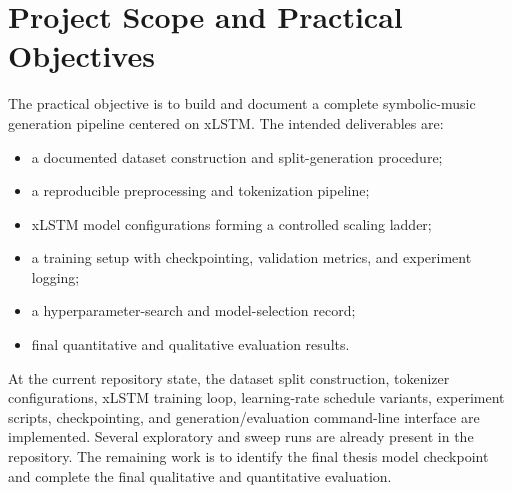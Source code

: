 \section{Project Scope and Practical Objectives}

The practical objective is to build and document a complete symbolic-music generation pipeline centered on xLSTM. The intended deliverables are:
\begin{itemize}
	\item a documented dataset construction and split-generation procedure;
	\item a reproducible preprocessing and tokenization pipeline;
	\item xLSTM model configurations forming a controlled scaling ladder;
	\item a training setup with checkpointing, validation metrics, and experiment logging;
	\item a hyperparameter-search and model-selection record;
	\item final quantitative and qualitative evaluation results.
\end{itemize}

At the current repository state, the dataset split construction, tokenizer configurations, xLSTM training loop, learning-rate schedule variants, experiment scripts, checkpointing, and generation/evaluation command-line interface are implemented. Several exploratory and sweep runs are already present in the repository. The remaining work is to identify the final thesis model checkpoint and complete the final qualitative and quantitative evaluation.
